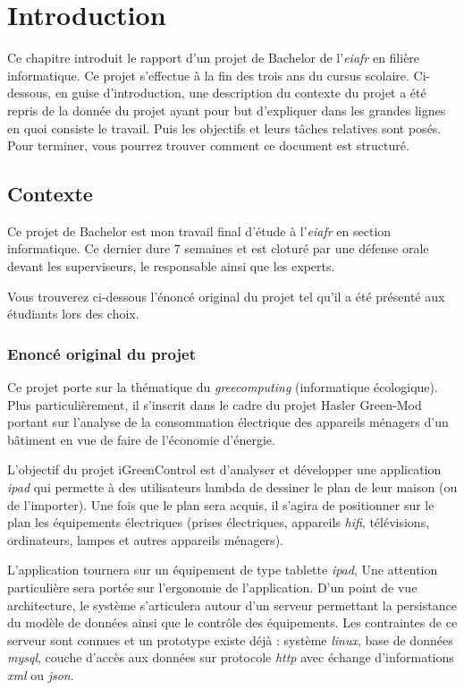 
\chapter{Introduction}
Ce chapitre introduit le rapport d'un projet de Bachelor de l'\emph{\gls{eiafr}} en filière informatique. Ce projet s'effectue à la fin des trois ans du cursus scolaire. Ci-dessous, en guise d'introduction, une description du contexte du projet a été repris de la donnée du projet ayant pour but d'expliquer dans les grandes lignes en quoi consiste le travail. Puis les objectifs et leurs tâches relatives sont posés. Pour terminer, vous pourrez trouver comment ce document est structuré.

\section{Contexte} %
\label{sec:contexte}
Ce projet de Bachelor est mon travail final d’étude à l'\emph{\gls{eiafr}} en section informatique. Ce dernier dure 7 semaines et est cloturé par une défense orale devant les superviseurs, le responsable ainsi que les experts.

\medskip

Vous trouverez ci-dessous l'énoncé original du projet tel qu'il a été présenté aux étudiants lors des choix.

\subsection{Enoncé original du projet} %
\label{sub:enonc_original_du_projet}
Ce projet porte sur la thématique du \emph{\gls{greecomputing}} 
(informatique écologique). Plus particulièrement, il s’inscrit dans le cadre du projet Hasler Green-Mod portant sur l’analyse de la consommation électrique des appareils ménagers d’un bâtiment en vue de faire de l’économie d’énergie.

\medskip

L'objectif du projet iGreenControl est d'analyser et développer une application \emph{\gls{ipad}} qui permette à des utilisateurs lambda de dessiner le plan de leur maison (ou de l'importer). Une fois que le plan sera acquis, il s’agira de positionner sur le plan les équipements électriques (prises électriques, appareils \emph{\gls{hifi}}, télévisions, ordinateurs, lampes et autres appareils 
ménagers).

\medskip

L'application tournera sur un équipement de type tablette \emph{\gls{ipad}}, Une attention particulière sera portée sur l’ergonomie de l'application. D'un point de vue architecture, le système s'articulera autour d'un serveur permettant la persistance du modèle de données ainsi que le contrôle des équipements. Les contraintes de ce serveur sont connues et un prototype existe déjà : système \emph{\gls{linux}}, base de données \emph{\gls{mysql}}, couche d’accès aux données sur protocole \emph{\gls{http}} avec échange d’informations \emph{\gls{xml}} ou \emph{\gls{json}}.


